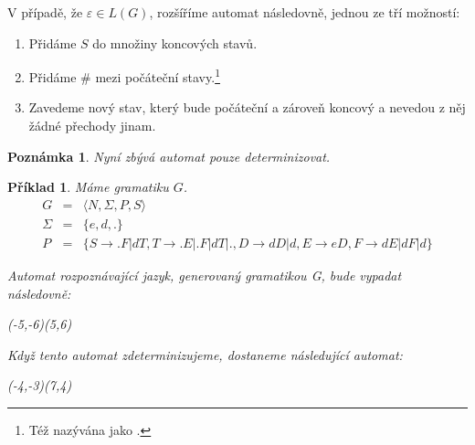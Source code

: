 \documentclass[10pt, a4paper, titlepage]{article}
\theoremstyle{note}
\newtheorem{priklad}{Příklad}
\newtheorem{poznamka}{Poznámka}
\begin{document}
V případě, že $\varepsilon \in L(G)$, rozšíříme automat následovně, jednou ze tří možností:
\begin{enumerate}
\item
Přidáme $S$ do množiny koncových stavů.

\item
Přidáme $\#$ mezi počáteční stavy.\footnote{Též nazývána jako .}

\item
Zavedeme nový stav, který bude počáteční a zároveň koncový a nevedou z něj žádné přechody jinam.
\end{enumerate}

\begin{poznamka}
Nyní zbývá automat pouze determinizovat.
\end{poznamka}

\begin{priklad}
Máme gramatiku $G$.
\begin{eqnarray*}
G &=& \langle N,\Sigma,P,S \rangle \\
\Sigma &=& \lbrace e,d,. \rbrace \\
P &=& \lbrace S \rightarrow .F | dT , T \rightarrow .E|.F|dT|. , D \rightarrow dD|d , E \rightarrow eD , F \rightarrow dE|dF|d \rbrace
\end{eqnarray*}

Automat rozpoznávající jazyk, generovaný gramatikou G, bude vypadat následovně:

\begin{center}
\begin{VCPicture}{(-5,-6)(5,6)}
\end{VCPicture}
\end{center}

Když tento automat zdeterminizujeme, dostaneme následující automat:

\begin{center}
\begin{VCPicture}{(-4,-3)(7,4)}
\end{VCPicture}
\end{center}

\end{priklad}
\end{document}
